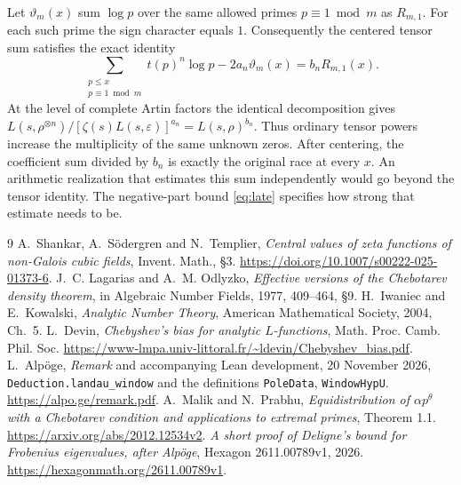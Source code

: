 \documentclass[11pt]{article}
\newcommand{\primesum}{\mathop{\sum}\limits}
\begin{document}
Let $\vartheta_m(x)$ sum $\log p$ over the same allowed primes $p\equiv1\bmod m$ as $R_{m,1}$. For each such prime the sign character equals $1$. Consequently the centered tensor sum satisfies the exact identity
\[
 \primesum_{\substack{p\le x\\p\equiv1\bmod m}}
                 t(p)^n\log p-2a_n\vartheta_m(x)=b_n R_{m,1}(x).
\]
At the level of complete Artin factors the identical decomposition gives
$L(s,\rho^{\otimes n})/[\zeta(s)L(s,\varepsilon)]^{a_n}=L(s,\rho)^{b_n}$.
Thus ordinary tensor powers increase the multiplicity of the same unknown zeros. After centering, the coefficient sum divided by $b_n$ is exactly the original race at every $x$. An arithmetic realization that estimates this sum independently would go beyond the tensor identity. The negative-part bound \eqref{eq:late} specifies how strong that estimate needs to be.

\begin{thebibliography}{9}
 A.~Shankar, A.~S\"odergren and N.~Templier, \emph{Central values of zeta functions of non-Galois cubic fields}, Invent. Math., \S3. \url{https://doi.org/10.1007/s00222-025-01373-6}.
 J.~C. Lagarias and A.~M. Odlyzko, \emph{Effective versions of the Chebotarev density theorem}, in Algebraic Number Fields, 1977, 409--464, \S9.
 H.~Iwaniec and E.~Kowalski, \emph{Analytic Number Theory}, American Mathematical Society, 2004, Ch.~5.
 L.~Devin, \emph{Chebyshev's bias for analytic $L$-functions}, Math. Proc. Camb. Phil. Soc. \url{https://www-lmpa.univ-littoral.fr/~ldevin/Chebyshev_bias.pdf}.
 L.~Alp\"oge, \emph{Remark} and accompanying Lean development, 20 November 2026, \texttt{Deduction.landau\_window} and the definitions \texttt{PoleData}, \texttt{WindowHypU}. \url{https://alpo.ge/remark.pdf}.
 A.~Malik and N.~Prabhu, \emph{Equidistribution of $\alpha p^\theta$ with a Chebotarev condition and applications to extremal primes}, Theorem 1.1. \url{https://arxiv.org/abs/2012.12534v2}.
 \emph{A short proof of Deligne's bound for Frobenius eigenvalues, after Alp\"oge}, Hexagon 2611.00789v1, 2026. \url{https://hexagonmath.org/2611.00789v1}.
\end{thebibliography}
\end{document}
